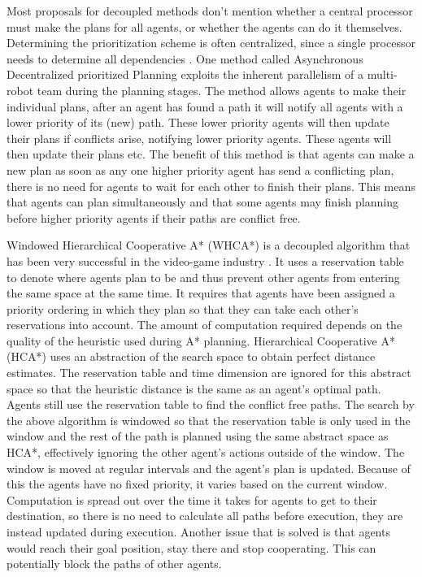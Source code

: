 Most proposals for decoupled methods don't mention whether a central processor
must make the plans for all agents, or whether the agents can do it themselves.
Determining the prioritization scheme is often centralized, since a
single processor needs to determine all dependencies \cite{bennewitz2002}. One
method called Asynchronous Decentralized prioritized Planning \cite{cap2012}
exploits the inherent parallelism of a multi-robot team during the planning
stages. The method allows
agents to make their individual plans, after an agent has found a path it will
notify all agents with a lower priority of its (new) path. These lower priority
agents will then update their plans if conflicts arise, notifying lower
priority agents. These agents will then update their plans etc. The benefit of
this method is that agents can make a new plan as soon as any one higher
priority agent has send a conflicting plan, there is no need for agents to
wait for each other to finish their plans. This means that agents can plan
simultaneously and that some agents may finish planning before higher priority
agents if their paths are conflict free.

Windowed Hierarchical Cooperative A* (WHCA*) is a decoupled algorithm that has
been very successful in the video-game industry \cite{silver2005}. It uses a
reservation table to denote where agents plan to be and thus prevent other
agents from entering the same space at the same time. It requires that agents
have been assigned a priority ordering in which they plan so that they can take
each other's reservations into account. The amount of computation required
depends on the quality of the heuristic used during A* planning. Hierarchical
Cooperative A* (HCA*) uses an abstraction of the search space to obtain perfect
distance estimates. The reservation table and time dimension are ignored for
this abstract space so that the heuristic distance is the same as an agent's
optimal path. Agents still use the reservation table to find the conflict free
paths.
The search by
the above algorithm is windowed so that the reservation table is only used in
the window and the rest of the path is planned using the same abstract space as
HCA*,
effectively ignoring the other agent's actions outside of the window. The
window is moved at regular intervals and the agent's plan is updated. Because
of this the agents have no fixed priority, it varies based on the current
window. Computation is spread out over the time it takes for agents to get to
their destination, so there is no need to calculate all paths before execution,
they are instead updated during execution. Another issue that is solved is that
agents would reach their goal position, stay there and stop cooperating. This
can potentially block the paths of other agents.

